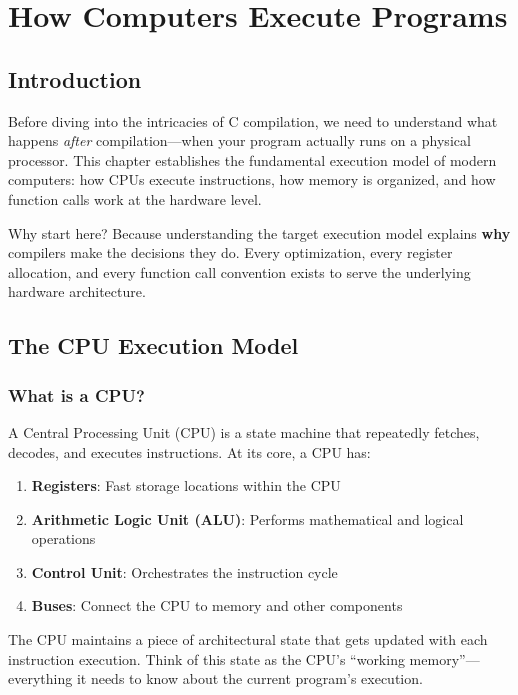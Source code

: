 \chapter{How Computers Execute Programs}

\section{Introduction}

Before diving into the intricacies of C compilation, we need to understand what happens \emph{after} compilation---when your program actually runs on a physical processor. This chapter establishes the fundamental execution model of modern computers: how CPUs execute instructions, how memory is organized, and how function calls work at the hardware level.

Why start here? Because understanding the target execution model explains \textbf{why} compilers make the decisions they do. Every optimization, every register allocation, and every function call convention exists to serve the underlying hardware architecture.

\section{The CPU Execution Model}

\subsection{What is a CPU?}

A Central Processing Unit (CPU) is a state machine that repeatedly fetches, decodes, and executes instructions. At its core, a CPU has:

\begin{enumerate}
  \item \textbf{Registers}: Fast storage locations within the CPU
  \item \textbf{Arithmetic Logic Unit (ALU)}: Performs mathematical and logical operations
  \item \textbf{Control Unit}: Orchestrates the instruction cycle
  \item \textbf{Buses}: Connect the CPU to memory and other components
\end{enumerate}

The CPU maintains a piece of architectural state that gets updated with each instruction execution. Think of this state as the CPU's ``working memory''---everything it needs to know about the current program's execution.

